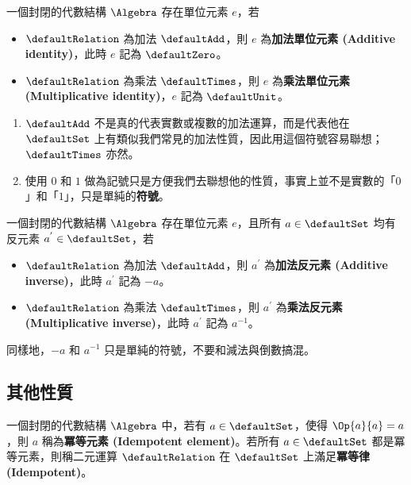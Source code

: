 \documentclass[12pt,a4paper,oneside]{report}
\begin{document}
\begin{CJK}{UTF8}{bkai}
\begin{mydef}[單位元素記號]
\label{def:algebra:identity_notation}
一個封閉的代數結構 $\Algebra$ 存在單位元素 $e$，若
\begin{itemize}
\item $\defaultRelation$ 為加法 $\defaultAdd$，則 $e$ 為\textbf{加法單位元素 (Additive identity)}，此時 $e$ 記為 $\defaultZero$。
\item $\defaultRelation$ 為乘法 $\defaultTimes$，則 $e$ 為\textbf{乘法單位元素 (Multiplicative identity)}，$e$ 記為 $\defaultUnit$。
\end{itemize}
\end{mydef}
\begin{mynote*}
\begin{enumerate}
\item $\defaultAdd$ 不是真的代表實數或複數的加法運算，而是代表他在 $\defaultSet$ 上有類似我們常見的加法性質，因此用這個符號容易聯想；$\defaultTimes$ 亦然。
\item 使用 $0$ 和 $1$ 做為記號只是方便我們去聯想他的性質，事實上並不是實數的「$0$」和「$1$」，只是單純的\textbf{符號}。
\end{enumerate}
\end{mynote*}

\begin{mydef}[反元素記號]
\label{def:algebra:inverse_notation}
一個封閉的代數結構 $\Algebra$ 存在單位元素 $e$，且所有 $a\in{\defaultSet}$ 均有反元素 $a^{'}\in{\defaultSet}$，若
\begin{itemize}
\item $\defaultRelation$ 為加法 $\defaultAdd$，則 $a^{'}$ 為\textbf{加法反元素 (Additive inverse)}，此時 $a^{'}$ 記為 $-a$。
\item $\defaultRelation$ 為乘法 $\defaultTimes$，則 $a^{'}$ 為\textbf{乘法反元素 (Multiplicative inverse)}，此時 $a^{'}$ 記為 $a^{-1}$。
\end{itemize}
\end{mydef}
\begin{mynote*}
同樣地，$-a$ 和 $a^{-1}$ 只是單純的符號，不要和減法與倒數搞混。
\end{mynote*}

\subsection{其他性質}

\begin{mydef}[冪等元素與冪等律]
\label{def:algebra:idempotent}
一個封閉的代數結構 $\Algebra$ 中，若有 $a\in{\defaultSet}$，使得 $\Op{a}{a}=a$，則 $a$ 稱為\textbf{冪等元素 (Idempotent element)}。若所有 $a\in{\defaultSet}$ 都是冪等元素，則稱二元運算 $\defaultRelation$ 在 $\defaultSet$ 上滿足\textbf{冪等律 (Idempotent)}。
\end{mydef}


\end{CJK}
\end{document}
